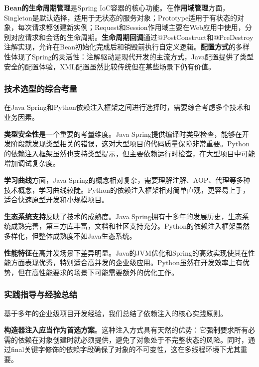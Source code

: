 \textbf{Bean的生命周期管理}是Spring IoC容器的核心功能。在\textbf{作用域管理}方面，Singleton是默认选择，适用于无状态的服务对象；Prototype适用于有状态的对象，每次请求都创建新实例；Request和Session作用域主要在Web应用中使用，分别对应请求和会话的生命周期。\textbf{生命周期回调}通过@PostConstruct和@PreDestroy注解实现，允许在Bean初始化完成后和销毁前执行自定义逻辑。\textbf{配置方式}的多样性体现了Spring的灵活性：注解驱动是现代开发的主流方式，Java配置提供了类型安全的配置体验，XML配置虽然比较传统但在某些场景下仍有价值。

\subsubsection{技术选型的综合考量}\label{ux6280ux672fux9009ux578bux7684ux7efcux5408ux8003ux91cf}

在Java Spring和Python依赖注入框架之间进行选择时，需要综合考虑多个技术和业务因素。

\textbf{类型安全性}是一个重要的考量维度。Java Spring提供编译时类型检查，能够在开发阶段就发现类型相关的错误，这对大型项目的代码质量保障非常重要。Python的依赖注入框架虽然也支持类型提示，但主要依赖运行时检查，在大型项目中可能增加调试复杂度。

\textbf{学习曲线}方面，Java Spring的概念相对复杂，需要理解注解、AOP、代理等多种技术概念，学习曲线较陡。Python的依赖注入框架相对简单直观，更容易上手，适合快速原型开发和小规模项目。

\textbf{生态系统支持}反映了技术的成熟度。Java Spring拥有十多年的发展历史，生态系统成熟完善，第三方库丰富，文档和社区支持充分。Python的依赖注入框架虽然多样化，但整体成熟度不如Java生态系统。

\textbf{性能特征}在高并发场景下差异明显。Java的JVM优化和Spring的高效实现使其在性能方面表现优秀，特别适合高并发的企业级应用。Python虽然在开发效率上有优势，但在高性能要求的场景下可能需要额外的优化工作。

\subsubsection{实践指导与经验总结}\label{ux5b9eux8df5ux6307ux5bfcux4e0eux7ecfux9a8cux603bux7ed3}

基于多年的企业级项目开发经验，我们总结了依赖注入的核心实践原则。

\textbf{构造器注入应当作为首选方案}。这种注入方式具有天然的优势：它强制要求所有必需的依赖在对象创建时就必须提供，避免了对象处于不完整状态的风险。同时，通过final关键字修饰的依赖字段确保了对象的不可变性，这在多线程环境下尤其重要。

